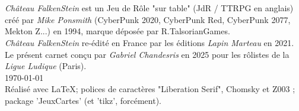 \documentclass[a5paper,pagesize,french]{book}
\begin{document}
\clearpage

~\\ \dotfill~\\

\hfill

\emph{Château FalkenStein} est un Jeu de Rôle "sur table" (JdR / TTRPG en anglais) créé par \emph{Mike Ponsmith} (CyberPunk 2020, CyberPunk Red, CyberPunk 2077, Mekton Z...) en 1994, marque déposée par R.TalsorianGames.~\\
\emph{Château FalkenStein} re-édité en France par les éditions \emph{Lapin Marteau} en 2021.~\\

Le présent carnet conçu par \emph{Gabriel Chandesris} en 2025 pour les rôlistes de la \emph{Ligue Ludique} (Paris).~\\
\today~\\

Réalisé avec \LaTeX ; polices de caractères "Liberation Serif", {\setmainfont{Chomsky} Chomsky } et { \setmainfont{Z003} Z003 } ; package 'JeuxCartes' (et 'tikz', forcément). 
  
\end{document}
